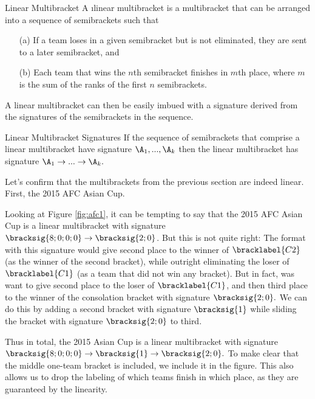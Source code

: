 {    \begin{definition}{Linear Multibracket}{}
        A \i{linear multibracket} is a multibracket that can be arranged into a sequence of semibrackets such that
        \begin{enumerate}
            \item[(a)] If a team loses in a given semibracket but is not eliminated, they are sent to a later semibracket, and
            \item[(b)] Each team that wins the $n$th semibracket finishes in $m$th place, where $m$ is the sum of the ranks of the first $n$ semibrackets.
        \end{enumerate}
    \end{definition}

    A linear multibracket can then be easily imbued with a signature derived from the signatures of the semibrackets in the sequence.

    \begin{definition}{Linear Multibracket Signatures}{}
        If the sequence of semibrackets that comprise a linear multibracket have signature $\A_1, ..., \A_k$ then the linear multibracket has signature $\A_1 \to ... \to \A_k.$
    \end{definition}

    Let's confirm that the multibrackets from the previous section are indeed linear. First, the 2015 AFC Asian Cup.


    Looking at Figure \ref{fig:afc1}, it can be tempting to say that the 2015 AFC Asian Cup is a linear multibracket with signature $\bracksig{8;0;0;0} \to \bracksig{2;0}$. But this is not quite right: The format with this signature would give second place to the winner of $\bracklabel{C2}$ (as the winner of the second bracket), while outright eliminating the loser of $\bracklabel{C1}$ (as a team that did not win any bracket). But in fact, was want to give second place to the loser of $\bracklabel{C1}$, and then third place to the winner of the consolation bracket with signature $\bracksig{2;0}.$ We can do this by adding a second bracket with signature $\bracksig{1}$ while sliding the bracket with signature $\bracksig{2;0}$ to third.

    Thus in total, the 2015 Asian Cup is a linear multibracket with signature $\bracksig{8;0;0;0} \to \bracksig{1} \to \bracksig{2;0}.$ To make clear that the middle one-team bracket is included, we include it in the figure. This also allows us to drop the labeling of which teams finish in which place, as they are guaranteed by the linearity.

}

